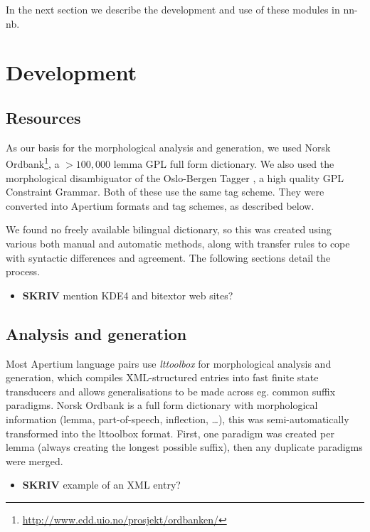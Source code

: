 \documentclass[11pt]{article}
\begin{document}
In the next section we describe the development and use of these
modules in nn-nb.

\section{Development}

  \label{SEC:development}
\subsection{Resources}

As our basis for the morphological analysis and generation, we used
Norsk
Ordbank\footnote{\href{http://www.edd.uio.no/prosjekt/ordbanken/}{http://www.edd.uio.no/prosjekt/ordbanken/}
}, a $>100,000$ lemma GPL full form dictionary. We also used the
morphological disambiguator of the Oslo-Bergen Tagger
\citep{hagen2000cbt}, a high quality GPL Constraint Grammar. Both of
these use the same tag scheme. They were converted into Apertium
formats and tag schemes, as described below.

We found no freely available bilingual dictionary, so this was created
using various both manual and automatic methods, along with transfer
rules to cope with syntactic differences and agreement. The following
sections detail the process.
\begin{itemize}

\item \textbf{SKRIV} mention KDE4 and bitextor web sites?\\

\end{itemize} 
\subsection{Analysis and generation}

Most Apertium language pairs use \emph{lttoolbox} for morphological
analysis and generation, which compiles XML-structured entries into
fast finite state transducers and allows generalisations to be made
across eg. common suffix paradigms. Norsk Ordbank is a full form
dictionary with morphological information (lemma, part-of-speech,
inflection, \ldots{}), this was semi-automatically transformed into
the lttoolbox format. First, one paradigm was created per lemma
(always creating the longest possible suffix), then any duplicate
paradigms were merged. \begin{itemize}

\item \textbf{SKRIV} example of an XML entry?\\

\end{itemize} 
\end{document}
